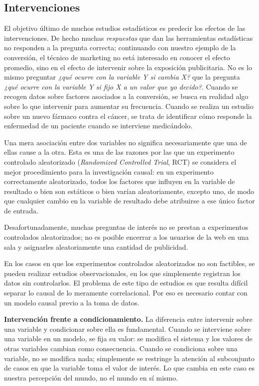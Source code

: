 \documentclass[12pt]{report} %
\begin{document}
\subsection{Intervenciones}

El objetivo último de muchos estudios estadísticos es predecir los efectos de las intervenciones. De hecho muchas \textit{respuestas} que dan las herramientas estadísticas no responden a la pregunta correcta; continuando con nuestro ejemplo de la conversión, el técnico de marketing no está interesado en conocer el efecto promedio, sino en el efecto de intervenir sobre la exposición publicitaria. No es lo mismo preguntar \textit{¿qué ocurre con la variable Y si cambia X?} que la pregunta \textit{¿qué ocurre con la variable Y si fijo X a un valor que yo decido?}. Cuando se recogen datos sobre factores asociados a la conversión, se busca en realidad algo sobre lo que intervenir para aumentar su frecuencia. Cuando se realiza un estudio sobre un nuevo fármaco contra el cáncer, se trata de identificar cómo responde la enfermedad de un paciente cuando se interviene medicándolo.

Una mera asociación entre dos variables no significa necesariamente que una de ellas cause a la otra. Esta es una de las razones por las que un experimento controlado aleatorizado (\textit{Randomized Controlled Trial}, RCT) se considera el mejor procedimiento para la investigación causal: en un experimento correctamente aleatorizado, todos los factores que influyen en la variable de resultado o bien son estáticos o bien varían aleatoriamente, excepto uno, de modo que cualquier cambio en la variable de resultado debe atribuirse a ese único factor de entrada.

Desafortunadamente, muchas preguntas de interés no se prestan a experimentos controlados aleatorizados; no es posible encerrar a los usuarios de la web en una sala y asignarles aleatoriamente una cantidad de publicidad.

En los casos en que los experimentos controlados aleatorizados no son factibles, se pueden realizar estudios observacionales, en los que simplemente registran los datos sin controlarlos. El problema de este tipo de estudios es que resulta difícil separar lo causal de lo meramente correlacional. Por eso es necesario contar con un modelo causal previo a la toma de datos.

\textbf{Intervención frente a condicionamiento.} La diferencia entre intervenir sobre una variable y condicionar sobre ella es fundamental. Cuando se interviene sobre una variable en un modelo, se fija su valor: se modifica el sistema y los valores de otras variables cambian como consecuencia. Cuando se condiciona sobre una variable, no se modifica nada; simplemente se restringe la atención al subconjunto de casos en que la variable toma el valor de interés. Lo que cambia en este caso es nuestra percepción del mundo, no el mundo en sí mismo.
\end{document}
